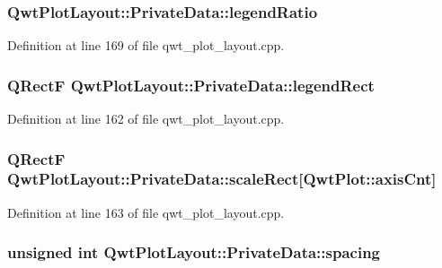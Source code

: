 \hypertarget{class_qwt_plot_layout_1_1_private_data_ac846f78297e9809786508adefec77b7b}{
\subsubsection[{legend\-Ratio}]{ Qwt\-Plot\-Layout\-::\-Private\-Data\-::legend\-Ratio}}\label{class_qwt_plot_layout_1_1_private_data_ac846f78297e9809786508adefec77b7b}


Definition at line 169 of file qwt\-\_\-plot\-\_\-layout.\-cpp.

\hypertarget{class_qwt_plot_layout_1_1_private_data_a3f2fbd12df85461b12846b62357b239e}{
\subsubsection[{legend\-Rect}]{\setlength{\rightskip}{0pt plus 5cm}Q\-Rect\-F Qwt\-Plot\-Layout\-::\-Private\-Data\-::legend\-Rect}}\label{class_qwt_plot_layout_1_1_private_data_a3f2fbd12df85461b12846b62357b239e}


Definition at line 162 of file qwt\-\_\-plot\-\_\-layout.\-cpp.

\hypertarget{class_qwt_plot_layout_1_1_private_data_a0f7fb5ef75cba603288d09e6174759a4}{
\subsubsection[{scale\-Rect}]{\setlength{\rightskip}{0pt plus 5cm}Q\-Rect\-F Qwt\-Plot\-Layout\-::\-Private\-Data\-::scale\-Rect\mbox{[}{\bf Qwt\-Plot\-::axis\-Cnt}\mbox{]}}}\label{class_qwt_plot_layout_1_1_private_data_a0f7fb5ef75cba603288d09e6174759a4}


Definition at line 163 of file qwt\-\_\-plot\-\_\-layout.\-cpp.

\hypertarget{class_qwt_plot_layout_1_1_private_data_a5892e92d2d8cd8819f158b677ac4a792}{
\subsubsection[{spacing}]{\setlength{\rightskip}{0pt plus 5cm}unsigned {\bf int} Qwt\-Plot\-Layout\-::\-Private\-Data\-::spacing}}\label{class_qwt_plot_layout_1_1_private_data_a5892e92d2d8cd8819f158b677ac4a792}


